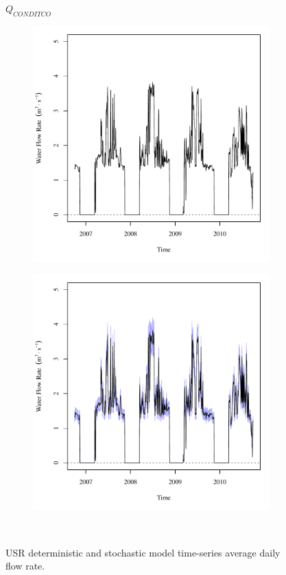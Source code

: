\subfiguremid
\begin{landscape}
	\begin{figure}
		\centering
		$ Q_{CONDITCO} $
		\begin{subfigure}{0.7\textwidth}
			\centering
			\includegraphics[width=\tableCustomSize]{"Figures/Results_USR/Deterministic/Q CON"}
		\end{subfigure}%
		\begin{subfigure}{0.7\textwidth}
			\centering
			\includegraphics[width=\tableCustomSize]{"Figures/Results_USR/Stochastic/Q CON"}
		\end{subfigure}\\
		\caption{USR deterministic and stochastic model time-series average daily flow rate.}
	\end{figure}
\end{landscape}
